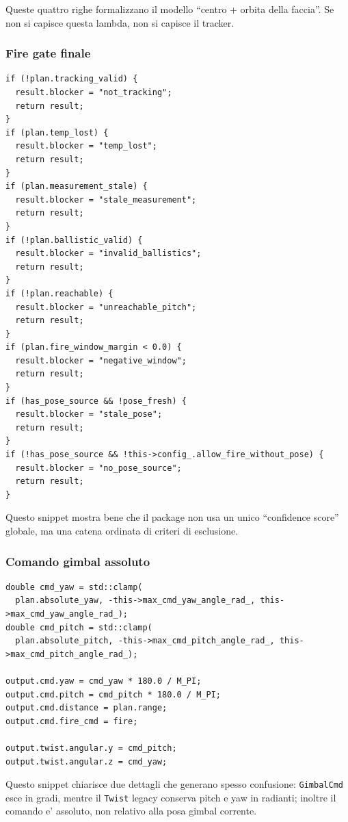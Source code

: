 \documentclass[11pt,a4paper]{article}
\newcommand{\code}[1]{\texttt{#1}}
\begin{document}
Queste quattro righe formalizzano il modello ``centro + orbita della faccia''. Se non si capisce questa lambda, non si capisce il tracker.

\subsubsection{Fire gate finale}

\begin{lstlisting}[style=cppstyle,caption={Estratto reale da FireGate::evaluate()}]
if (!plan.tracking_valid) {
  result.blocker = "not_tracking";
  return result;
}
if (plan.temp_lost) {
  result.blocker = "temp_lost";
  return result;
}
if (plan.measurement_stale) {
  result.blocker = "stale_measurement";
  return result;
}
if (!plan.ballistic_valid) {
  result.blocker = "invalid_ballistics";
  return result;
}
if (!plan.reachable) {
  result.blocker = "unreachable_pitch";
  return result;
}
if (plan.fire_window_margin < 0.0) {
  result.blocker = "negative_window";
  return result;
}
if (has_pose_source && !pose_fresh) {
  result.blocker = "stale_pose";
  return result;
}
if (!has_pose_source && !this->config_.allow_fire_without_pose) {
  result.blocker = "no_pose_source";
  return result;
}
\end{lstlisting}

Questo snippet mostra bene che il package non usa un unico ``confidence score'' globale, ma una catena ordinata di criteri di esclusione.

\subsubsection{Comando gimbal assoluto}

\begin{lstlisting}[style=cppstyle,caption={Estratto reale da GimbalCommandController::makeShotOutput()}]
double cmd_yaw = std::clamp(
  plan.absolute_yaw, -this->max_cmd_yaw_angle_rad_, this->max_cmd_yaw_angle_rad_);
double cmd_pitch = std::clamp(
  plan.absolute_pitch, -this->max_cmd_pitch_angle_rad_, this->max_cmd_pitch_angle_rad_);

output.cmd.yaw = cmd_yaw * 180.0 / M_PI;
output.cmd.pitch = cmd_pitch * 180.0 / M_PI;
output.cmd.distance = plan.range;
output.cmd.fire_cmd = fire;

output.twist.angular.y = cmd_pitch;
output.twist.angular.z = cmd_yaw;
\end{lstlisting}

Questo snippet chiarisce due dettagli che generano spesso confusione: \code{GimbalCmd} esce in gradi, mentre il \code{Twist} legacy conserva pitch e yaw in radianti; inoltre il comando e' assoluto, non relativo alla posa gimbal corrente.
\end{document}
